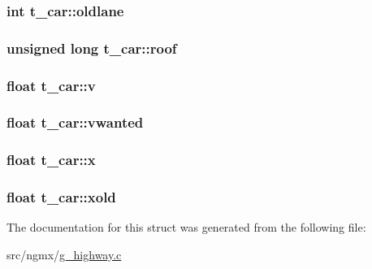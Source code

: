 \hypertarget{structt__car_a3288b5d6b5c8860f803f01bbb5405c25}{
\subsubsection[{oldlane}]{\setlength{\rightskip}{0pt plus 5cm}int {\bf t\-\_\-car\-::oldlane}}}\label{structt__car_a3288b5d6b5c8860f803f01bbb5405c25}
\hypertarget{structt__car_a341c699151fbcf496fa8927b3224833e}{
\subsubsection[{roof}]{\setlength{\rightskip}{0pt plus 5cm}unsigned long {\bf t\-\_\-car\-::roof}}}\label{structt__car_a341c699151fbcf496fa8927b3224833e}
\hypertarget{structt__car_a861ad72035b6843654b659ec04331b6e}{
\subsubsection[{v}]{\setlength{\rightskip}{0pt plus 5cm}float {\bf t\-\_\-car\-::v}}}\label{structt__car_a861ad72035b6843654b659ec04331b6e}
\hypertarget{structt__car_a794716a87c7479186afd1113f78672ce}{
\subsubsection[{vwanted}]{\setlength{\rightskip}{0pt plus 5cm}float {\bf t\-\_\-car\-::vwanted}}}\label{structt__car_a794716a87c7479186afd1113f78672ce}
\hypertarget{structt__car_a9db73a0f5dc8edda74116262ce5199ee}{
\subsubsection[{x}]{\setlength{\rightskip}{0pt plus 5cm}float {\bf t\-\_\-car\-::x}}}\label{structt__car_a9db73a0f5dc8edda74116262ce5199ee}
\hypertarget{structt__car_ab52414bf59621bef578682ceacee2353}{
\subsubsection[{xold}]{\setlength{\rightskip}{0pt plus 5cm}float {\bf t\-\_\-car\-::xold}}}\label{structt__car_ab52414bf59621bef578682ceacee2353}


\-The documentation for this struct was generated from the following file\-:\begin{DoxyCompactItemize}
\item 
src/ngmx/\hyperlink{g__highway_8c}{g\-\_\-highway.\-c}\end{DoxyCompactItemize}
